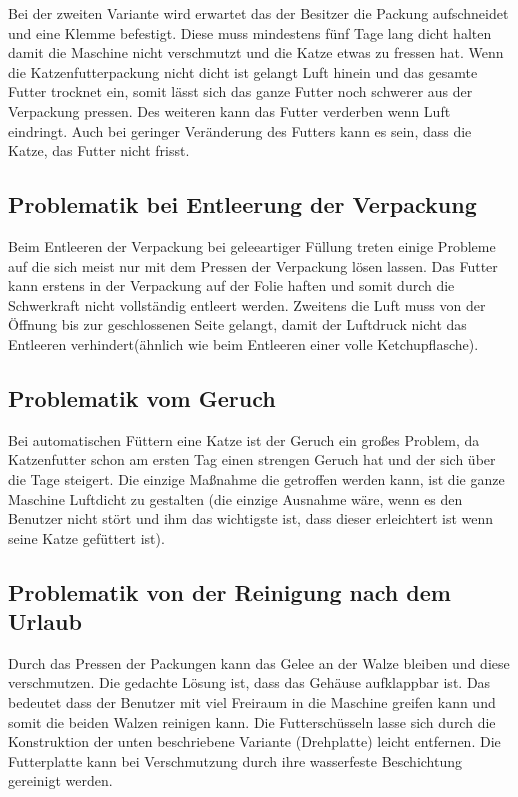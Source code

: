 Bei der zweiten Variante wird erwartet das der Besitzer die Packung aufschneidet und eine Klemme befestigt. Diese muss mindestens fünf Tage lang dicht halten damit die Maschine nicht verschmutzt und die Katze etwas zu fressen hat. Wenn die Katzenfutterpackung nicht dicht ist gelangt Luft hinein und das gesamte Futter trocknet ein, somit lässt sich das ganze Futter noch schwerer aus der Verpackung pressen. Des weiteren kann das Futter verderben wenn Luft eindringt. Auch bei geringer Veränderung des Futters kann es sein, dass die Katze, das Futter nicht frisst.

\subsection{Problematik bei Entleerung der Verpackung}

Beim Entleeren der Verpackung bei geleeartiger Füllung treten einige Probleme auf die sich meist nur mit dem Pressen der Verpackung lösen lassen. Das Futter kann erstens in der Verpackung auf der Folie haften und somit durch die Schwerkraft nicht vollständig entleert werden. Zweitens die Luft muss von der Öffnung bis zur geschlossenen Seite gelangt, damit der Luftdruck nicht das Entleeren verhindert(ähnlich wie beim Entleeren einer volle Ketchupflasche). 

\subsection{Problematik vom Geruch}

Bei automatischen Füttern eine Katze ist der Geruch ein großes Problem, da Katzenfutter schon am ersten Tag einen strengen Geruch hat und der sich über die Tage steigert. Die einzige Maßnahme die getroffen werden kann, ist die ganze Maschine Luftdicht zu gestalten (die einzige Ausnahme wäre, wenn es den Benutzer nicht stört und ihm das wichtigste ist, dass dieser erleichtert ist wenn seine Katze gefüttert ist). 

\subsection{Problematik von der Reinigung nach dem Urlaub}

Durch das Pressen der Packungen kann das Gelee an der Walze bleiben und diese verschmutzen. Die gedachte Lösung ist, dass das Gehäuse aufklappbar ist. Das bedeutet dass der Benutzer mit viel Freiraum in die Maschine greifen kann und  somit die beiden Walzen reinigen kann. Die Futterschüsseln lasse sich durch die Konstruktion der unten beschriebene Variante (Drehplatte) leicht entfernen. Die Futterplatte kann bei Verschmutzung durch ihre wasserfeste Beschichtung gereinigt werden.

